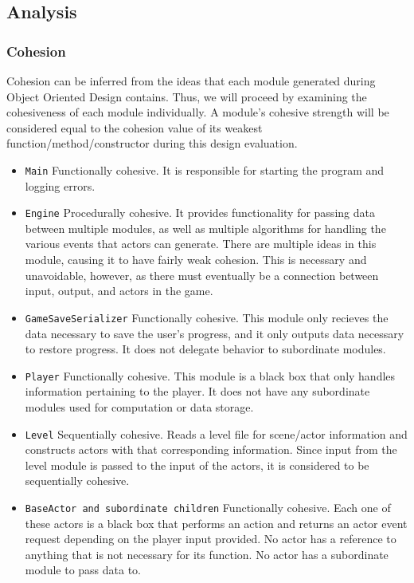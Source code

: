 \documentclass{article}
\begin{document}
	\subsection{Analysis}
		\subsubsection{Cohesion}
			Cohesion can be inferred from the ideas that each module generated during Object Oriented Design contains. Thus, we will proceed by examining the cohesiveness of each module individually. A module's cohesive strength will be considered equal to the cohesion value of its weakest function/method/constructor during this design evaluation.
			\begin{itemize}
				\item \texttt{Main} Functionally cohesive. It is responsible for starting the program and logging errors.
        \item \texttt{Engine} Procedurally cohesive. It provides functionality for passing data between multiple modules, as well as multiple algorithms for handling the various events that actors can generate. There are multiple ideas in this module, causing it to have fairly weak cohesion. This is necessary and unavoidable, however, as there must eventually be a connection between input, output, and actors in the game.
        \item \texttt{GameSaveSerializer} Functionally cohesive. This module only recieves the data necessary to save the user's progress, and it only outputs data necessary to restore progress. It does not delegate behavior to subordinate modules.
        \item \texttt{Player} Functionally cohesive. This module is a black box that only handles information pertaining to the player. It does not have any subordinate modules used for computation or data storage.
        \item \texttt{Level} Sequentially cohesive. Reads a level file for scene/actor information and constructs actors with that corresponding information. Since input from the level module is passed to the input of the actors, it is considered to be sequentially cohesive.
        \item \texttt{BaseActor and subordinate children} Functionally cohesive. Each one of these actors is a black box that performs an action and returns an actor event request depending on the player input provided. No actor has a reference to anything that is not necessary for its function. No actor has a subordinate module to pass data to.

\end{itemize}
\end{document}
